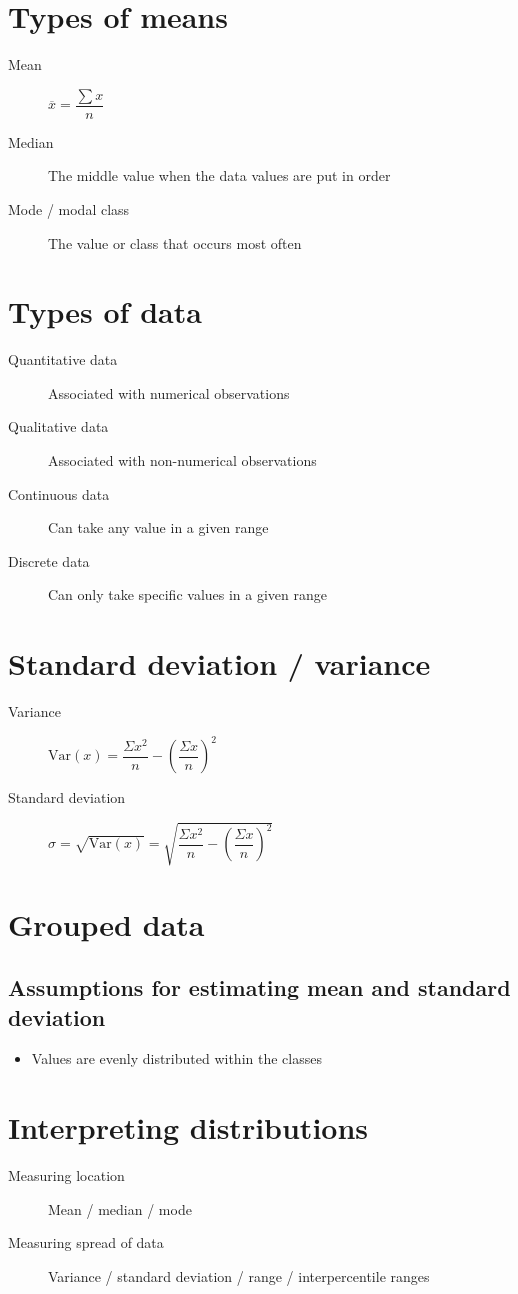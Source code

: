 \section{Types of means}
\begin{description}
    \item[Mean] $\overline{x}=\dfrac{\sum x}{n}$
    \item[Median] The middle value when the data values are put in order
    \item[Mode / modal class] The value or class that occurs most often
\end{description}

\section{Types of data}
\begin{description}
    \item[Quantitative data] Associated with numerical observations
    \item[Qualitative data] Associated with non-numerical observations
    \item[Continuous data] Can take any value in a given range
    \item[Discrete data] Can only take specific values in a given range
\end{description}

\section{Standard deviation / variance}
\begin{description}
    \item[Variance] $\mathrm{Var}(x)=\dfrac{\Sigma x^2}{n} - (\dfrac{\Sigma x}{n})^2$
    \item[Standard deviation] $\sigma=\sqrt{\mathrm{Var}(x)}=\sqrt{\dfrac{\Sigma x^2}{n} - (\dfrac{\Sigma x}{n})^2}$
\end{description}

\section{Grouped data}
\subsection{Assumptions for estimating mean and standard deviation}
\begin{itemize}
    \item Values are evenly distributed within the classes
\end{itemize}

\section{Interpreting distributions}
\begin{description}
    \item[Measuring location] Mean / median / mode
    \item[Measuring spread of data] Variance / standard deviation / range / interpercentile ranges
\end{description}
